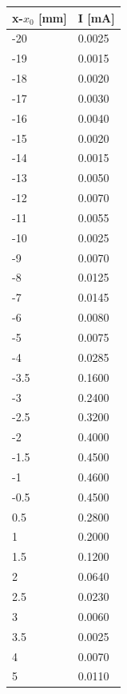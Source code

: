 \begin{minipage}{\linewidth}
    \begin{table}[H]
        \centering
    \begin{tabular}{ll}
        \toprule
        x-$x_0$ [mm] & I [mA] \\
        \midrule
        -20  &   0.0025 \\ 
        -19  &   0.0015 \\ 
        -18  &   0.0020  \\ 
        -17  &   0.0030  \\ 
        -16  &   0.0040  \\ 
        -15  &   0.0020  \\ 
        -14  &   0.0015 \\ 
        -13  &   0.0050  \\ 
        -12  &   0.0070  \\ 
        -11  &   0.0055 \\ 
        -10  &   0.0025 \\ 
        -9   &   0.0070  \\ 
        -8   &   0.0125 \\ 
        -7   &   0.0145 \\ 
        -6   &   0.0080  \\ 
        -5   &   0.0075 \\ 
        -4   &   0.0285 \\ 
        -3.5 &   0.1600   \\ 
        -3   &   0.2400   \\ 
        -2.5 &   0.3200   \\ 
        -2   &   0.4000    \\ 
        -1.5 &   0.4500   \\ 
        -1   &   0.4600   \\ 
        -0.5 &   0.4500   \\ 
        0.5  &   0.2800   \\ 
        1    &   0.2000    \\ 
        1.5  &   0.1200   \\ 
        2    &   0.0640  \\ 
        2.5  &   0.0230  \\ 
        3    &   0.0060  \\ 
        3.5  &   0.0025 \\ 
        4    &   0.0070  \\ 
        5    &   0.0110  \\ 

\end{tabular}
\end{table}
\end{minipage}
